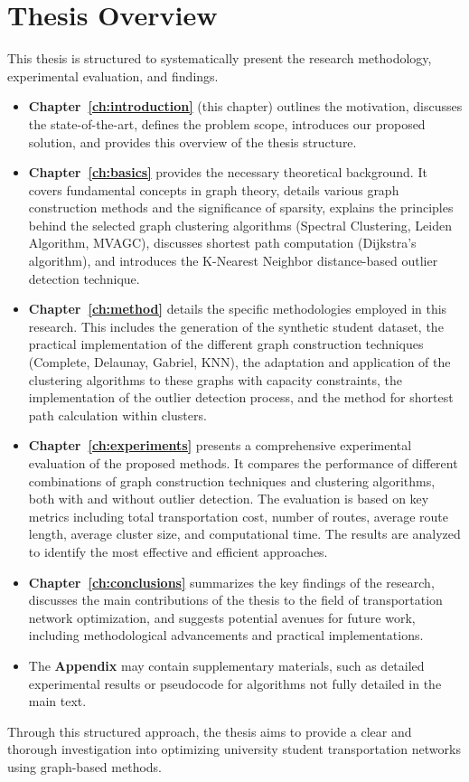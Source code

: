 \section{Thesis Overview}
\label{sec:intro_overview}
This thesis is structured to systematically present the research methodology, experimental evaluation, and findings.
\begin{itemize}
    \item \textbf{Chapter~\ref{ch:introduction}} (this chapter) outlines the motivation, discusses the state-of-the-art, defines the problem scope, introduces our proposed solution, and provides this overview of the thesis structure.
    \item \textbf{Chapter~\ref{ch:basics}} provides the necessary theoretical background. It covers fundamental concepts in graph theory, details various graph construction methods and the significance of sparsity, explains the principles behind the selected graph clustering algorithms (Spectral Clustering, Leiden Algorithm, MVAGC), discusses shortest path computation (Dijkstra's algorithm), and introduces the K-Nearest Neighbor distance-based outlier detection technique.
    \item \textbf{Chapter~\ref{ch:method}} details the specific methodologies employed in this research. This includes the generation of the synthetic student dataset, the practical implementation of the different graph construction techniques (Complete, Delaunay, Gabriel, KNN), the adaptation and application of the clustering algorithms to these graphs with capacity constraints, the implementation of the outlier detection process, and the method for shortest path calculation within clusters.
    \item \textbf{Chapter~\ref{ch:experiments}} presents a comprehensive experimental evaluation of the proposed methods. It compares the performance of different combinations of graph construction techniques and clustering algorithms, both with and without outlier detection. The evaluation is based on key metrics including total transportation cost, number of routes, average route length, average cluster size, and computational time. The results are analyzed to identify the most effective and efficient approaches.
    \item \textbf{Chapter~\ref{ch:conclusions}} summarizes the key findings of the research, discusses the main contributions of the thesis to the field of transportation network optimization, and suggests potential avenues for future work, including methodological advancements and practical implementations.
    \item The \textbf{Appendix} may contain supplementary materials, such as detailed experimental results or pseudocode for algorithms not fully detailed in the main text.
\end{itemize}
Through this structured approach, the thesis aims to provide a clear and thorough investigation into optimizing university student transportation networks using graph-based methods.







